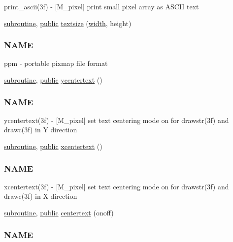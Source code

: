 \begin{DoxyCompactItemize}
\begin{DoxyCompactList}
print\+\_\+ascii(3f) -\/ \mbox{[}M\+\_\+pixel\mbox{]} print small pixel array as A\+S\+C\+II text \end{DoxyCompactList}\item 
\hyperlink{M__stopwatch_83_8txt_acfbcff50169d691ff02d4a123ed70482}{subroutine}, \hyperlink{M__stopwatch_83_8txt_a2f74811300c361e53b430611a7d1769f}{public} \hyperlink{namespacem__pixel_a070e9fff1f2cd0c89d40c5d3c72b7f2c}{textsize} (\hyperlink{namespacem__pixel_abf266872f93a04af39d2903fb20d2a0d}{width}, height)
\begin{DoxyCompactList}\small\item\em \subsubsection*{N\+A\+ME}

ppm -\/ portable pixmap file format \end{DoxyCompactList}\item 
\hyperlink{M__stopwatch_83_8txt_acfbcff50169d691ff02d4a123ed70482}{subroutine}, \hyperlink{M__stopwatch_83_8txt_a2f74811300c361e53b430611a7d1769f}{public} \hyperlink{namespacem__pixel_a2e32105b5e77abf38768fec6b11376a3}{ycentertext} ()
\begin{DoxyCompactList}\small\item\em \subsubsection*{N\+A\+ME}

ycentertext(3f) -\/ \mbox{[}M\+\_\+pixel\mbox{]} set text centering mode on for drawstr(3f) and drawc(3f) in Y direction \end{DoxyCompactList}\item 
\hyperlink{M__stopwatch_83_8txt_acfbcff50169d691ff02d4a123ed70482}{subroutine}, \hyperlink{M__stopwatch_83_8txt_a2f74811300c361e53b430611a7d1769f}{public} \hyperlink{namespacem__pixel_a1e0c43d36b35eafea921f91c31d8a478}{xcentertext} ()
\begin{DoxyCompactList}\small\item\em \subsubsection*{N\+A\+ME}

xcentertext(3f) -\/ \mbox{[}M\+\_\+pixel\mbox{]} set text centering mode on for drawstr(3f) and drawc(3f) in X direction \end{DoxyCompactList}\item 
\hyperlink{M__stopwatch_83_8txt_acfbcff50169d691ff02d4a123ed70482}{subroutine}, \hyperlink{M__stopwatch_83_8txt_a2f74811300c361e53b430611a7d1769f}{public} \hyperlink{namespacem__pixel_a9ddc8e8604bbc3181c728f08a6b87904}{centertext} (onoff)
\begin{DoxyCompactList}\small\item\em \subsubsection*{N\+A\+ME}


\end{DoxyCompactList}
\end{DoxyCompactItemize}
